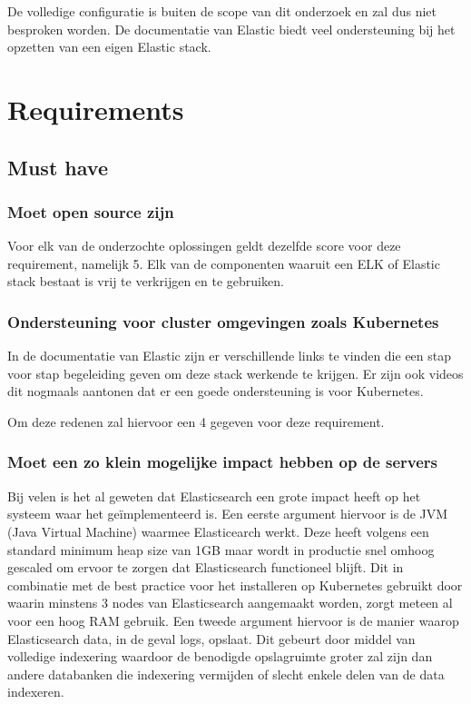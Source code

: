 De volledige configuratie is buiten de scope van dit onderzoek en zal dus niet besproken worden. De documentatie van Elastic biedt veel ondersteuning bij het opzetten van een eigen Elastic stack.

\section{Requirements}

\subsection{Must have}
\subsubsection{Moet open source zijn}
Voor elk van de onderzochte oplossingen geldt dezelfde score voor deze requirement, namelijk 5. Elk van de componenten waaruit een ELK of Elastic stack bestaat is vrij te verkrijgen en te gebruiken.

\subsubsection{Ondersteuning voor cluster omgevingen zoals Kubernetes}
In de documentatie van Elastic \autocite{elastic} zijn er verschillende links te vinden die een stap voor stap begeleiding geven om deze stack werkende te krijgen. Er zijn ook videos dit nogmaals aantonen dat er een goede ondersteuning is voor Kubernetes.

Om deze redenen zal hiervoor een 4 gegeven voor deze requirement.

\subsubsection{Moet een zo klein mogelijke impact hebben op de servers}
Bij velen is het al geweten dat Elasticsearch een grote impact heeft op het systeem waar het geïmplementeerd is. Een eerste argument hiervoor is de JVM (Java Virtual Machine) waarmee Elasticearch werkt. Deze heeft volgens \cite{elasticheap} een standard minimum heap size van 1GB maar wordt in productie snel omhoog gescaled om ervoor te zorgen dat Elasticsearch functioneel blijft. Dit in combinatie met de best practice voor het installeren op Kubernetes gebruikt door \cite{swidler2018} waarin minstens 3 nodes van Elasticsearch aangemaakt worden, zorgt meteen al voor een hoog RAM gebruik. Een tweede argument hiervoor is de manier waarop Elasticsearch data, in de geval logs, opslaat. Dit gebeurt door middel van volledige indexering waardoor de benodigde opslagruimte groter zal zijn dan andere databanken die indexering vermijden of slecht enkele delen van de data indexeren. 

